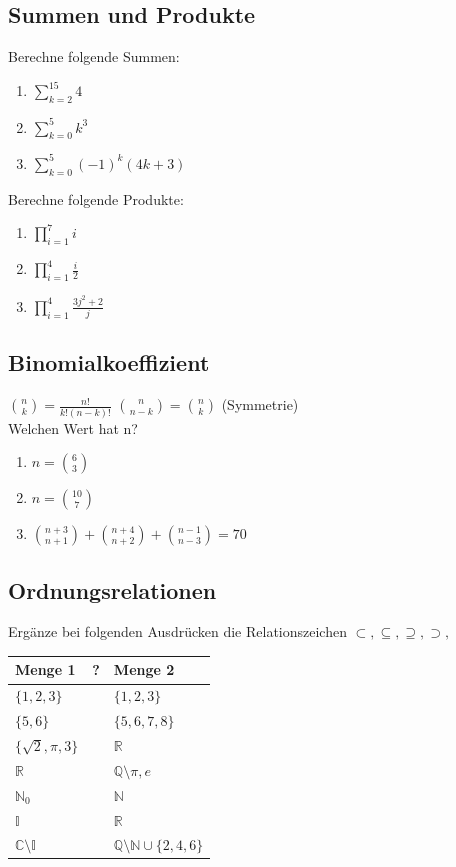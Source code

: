 \documentclass[11pt, a4paper]{article}
\begin{document}
\subsection{Summen und Produkte}
Berechne folgende Summen:
\begin{enumerate}
	\item $\sum_{k=2}^{15} 4$
	\item $\sum_{k=0}^5 k^3$
	\item $\sum_{k=0}^5 (-1)^k (4k+3)$
\end{enumerate}
Berechne folgende Produkte:
\begin{enumerate}
	\item $\prod_{i=1}^7 i$
	\item $\prod_{i=1}^4 \frac{i}{2}$
	\item $\prod_{i=1}^4 \frac{3j^2+2}{j}$
\end{enumerate}

\subsection{Binomialkoeffizient}
$\binom{n}{k} = \frac{n!}{k!(n-k)!}$ \qquad $\binom{n}{n-k} = \binom{n}{k}$ (Symmetrie) \\
Welchen Wert hat n?
\begin{enumerate}
	\item $ n = \binom{6}{3}$
	\item $n = \binom{10}{7}$
	\item $\binom{n+3}{n+1} + \binom{n+4}{n+2} + \binom{n-1}{n-3} = 70$
\end{enumerate}

\subsection{Ordnungsrelationen}
Ergänze bei folgenden Ausdrücken die Relationszeichen $\subset, \subseteq, \supseteq, \supset,$ \\
\begin{tabular}{|l|c|l|}
	\hline
	Menge 1 & \hspace{3mm} ? \hspace{3mm} & Menge 2 \\ \hline
	$\{1,2,3\}$ & & $\{1,2,3\}$ \\
	$\{5,6\}$ & & $\{5,6,7,8\}$ \\
	$\{\sqrt{2}, \pi, 3\}$ & & $\mathbb{R}$ \\
	$\mathbb{R}$ & & $\mathbb{Q} \setminus {\pi, e}$ \\
	$\mathbb{N}_0$ & & $\mathbb{N}$ \\
	$\mathbb{I}$ & & $\mathbb{R}$ \\
	$\mathbb{C} \setminus \mathbb{I}$ & & $\mathbb{Q} \setminus \mathbb{N} \cup \{2,4,6\}$ \\ \hline
\end{tabular}
\end{document}
